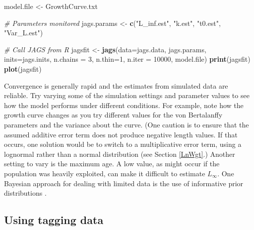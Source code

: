 \documentclass[
]{krantz}
\makeatletter
\newenvironment{Shaded}{\begin{snugshade}}{\end{snugshade}}
\newcommand{\AttributeTok}[1]{\textcolor[rgb]{0.27,0.27,0.27}{#1}}
\newcommand{\CommentTok}[1]{\textcolor[rgb]{0.37,0.37,0.37}{\textit{#1}}}
\newcommand{\DecValTok}[1]{\textcolor[rgb]{0.06,0.06,0.06}{#1}}
\newcommand{\FunctionTok}[1]{\textcolor[rgb]{0.27,0.27,0.27}{\textbf{#1}}}
\newcommand{\NormalTok}[1]{#1}
\newcommand{\OtherTok}[1]{\textcolor[rgb]{0.37,0.37,0.37}{#1}}
\newcommand{\StringTok}[1]{\textcolor[rgb]{0.5,0.5,0.5}{#1}}
\newenvironment{kframe}{%
\medskip{}
\setlength{\fboxsep}{.8em}
 \def\at@end@of@kframe{}%
 \ifinner\ifhmode%
  \def\at@end@of@kframe{\end{minipage}}%
  \begin{minipage}{\columnwidth}%
 \fi\fi%
 \def\FrameCommand##1{\hskip\@totalleftmargin \hskip-\fboxsep
 \colorbox{shadecolor}{##1}\hskip-\fboxsep
     \hskip-\linewidth \hskip-\@totalleftmargin \hskip\columnwidth}%
 \MakeFramed {\advance\hsize-\width
   \@totalleftmargin\z@ \linewidth\hsize
   \@setminipage}}%
 {\par\unskip\endMakeFramed%
 \at@end@of@kframe}
\renewenvironment{Shaded}{\begin{kframe}}{\end{kframe}}
\makeatother
\begin{document}
\begin{Shaded}
\begin{Highlighting}[]
\NormalTok{model.file }\OtherTok{\textless{}{-}} \StringTok{\textquotesingle{}GrowthCurve.txt\textquotesingle{}}

\CommentTok{\# Parameters monitored}
\NormalTok{jags.params }\OtherTok{\textless{}{-}} \FunctionTok{c}\NormalTok{(}\StringTok{"L\_inf.est"}\NormalTok{, }\StringTok{"k.est"}\NormalTok{, }\StringTok{"t0.est"}\NormalTok{, }\StringTok{"Var\_L.est"}\NormalTok{)}

\CommentTok{\# Call JAGS from R}
\NormalTok{jagsfit }\OtherTok{\textless{}{-}} \FunctionTok{jags}\NormalTok{(}\AttributeTok{data=}\NormalTok{jags.data, jags.params, }\AttributeTok{inits=}\NormalTok{jags.inits,}
                \AttributeTok{n.chains =} \DecValTok{3}\NormalTok{, }\AttributeTok{n.thin=}\DecValTok{1}\NormalTok{, }\AttributeTok{n.iter =} \DecValTok{10000}\NormalTok{,}
\NormalTok{                model.file)}
\FunctionTok{print}\NormalTok{(jagsfit)}
\FunctionTok{plot}\NormalTok{(jagsfit)}
\end{Highlighting}
\end{Shaded}

Convergence is generally rapid and the estimates from simulated data are reliable. Try varying some of the simulation settings and parameter values to see how the model performs under different conditions. For example, note how the growth curve changes as you try different values for the von Bertalanffy parameters and the variance about the curve. (One caution is to ensure that the assumed additive error term does not produce negative length values. If that occurs, one solution would be to switch to a multiplicative error term, using a lognormal rather than a normal distribution (see Section \ref{LnWgt}.) Another setting to vary is the maximum age. A low value, as might occur if the population was heavily exploited, can make it difficult to estimate \(L_\infty\). One Bayesian approach for dealing with limited data is the use of informative prior distributions \citep{doll.jacquemin_2018}.

\hypertarget{GrowthInc}{%
\subsection{Using tagging data}\label{GrowthInc}}
\end{document}

